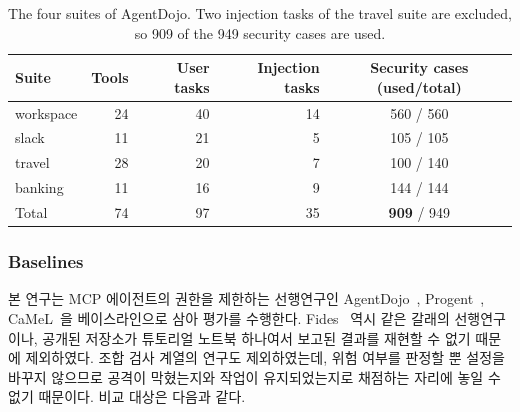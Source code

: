 \documentclass[acmsmall,screen,review,anonymous]{acmart}
\begin{document}
\begin{table}[t]
\caption{The four suites of AgentDojo. Two injection tasks of the travel suite are excluded, so 909 of the 949 security cases are used.}
\label{tab:cases}
\small
\begin{tabular}{lrrrc}
\toprule
Suite & Tools & User tasks & Injection tasks & Security cases (used/total) \\
\midrule
workspace & 24 & 40 & 14 & 560 / 560 \\
slack     & 11 & 21 &  5 & 105 / 105 \\
travel    & 28 & 20 &  7 & 100 / 140 \\
banking   & 11 & 16 &  9 & 144 / 144 \\
\midrule
Total     & 74 & 97 & 35 & \textbf{909} / 949 \\
\bottomrule
\end{tabular}
\end{table}


\subsubsection{Baselines}

본 연구는 MCP 에이전트의 권한을 제한하는 선행연구인 AgentDojo~\cite{debenedetti2024agentdojo}, Progent~\cite{shi2025progent}, CaMeL~\cite{debenedetti2025defeating}을 베이스라인으로 삼아 평가를 수행한다. Fides~\cite{costa2025securing} 역시 같은 갈래의 선행연구이나, 공개된 저장소가 튜토리얼 노트북 하나여서 보고된 결과를 재현할 수 없기 때문에 제외하였다. 조합 검사 계열의 연구도 제외하였는데, 위험 여부를 판정할 뿐 설정을 바꾸지 않으므로 공격이 막혔는지와 작업이 유지되었는지로 채점하는 자리에 놓일 수 없기 때문이다. 비교 대상은 다음과 같다.
\end{document}
